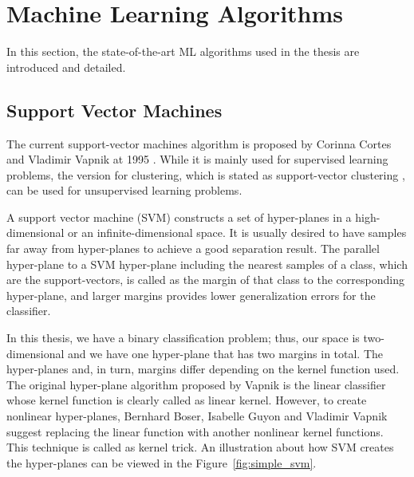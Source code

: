 \section{Machine Learning Algorithms}

In this section, the state-of-the-art ML algorithms used in the thesis are introduced and detailed. 
\subsection{Support Vector Machines}

The current support-vector machines algorithm is proposed by Corinna Cortes and Vladimir Vapnik at 1995 \cite{svm_original}. While it is mainly used for supervised learning problems, the version for clustering, which is stated as support-vector clustering \cite{support_vector_clustering}, can be used for unsupervised learning problems.

A support vector machine (SVM) constructs a set of hyper-planes in a high-dimensional or an infinite-dimensional space. It is usually desired to have samples far away from hyper-planes to achieve a good separation result. The parallel hyper-plane to a SVM hyper-plane including the nearest samples of a class, which are the support-vectors, is called as the margin of that class to the corresponding hyper-plane, and larger margins provides lower generalization errors for the classifier. 

In this thesis, we have a binary classification problem; thus, our space is two-dimensional and we have one hyper-plane that has two margins in total. The hyper-planes and, in turn, margins differ depending on the kernel function used. The original hyper-plane algorithm proposed by Vapnik \cite{svm_original} is the linear classifier whose kernel function is clearly called as linear kernel. However, to create nonlinear hyper-planes, Bernhard Boser, Isabelle Guyon  and Vladimir Vapnik \cite{svm_kernel} suggest replacing the linear function with another nonlinear kernel functions. This technique is called as kernel trick. An illustration about how SVM creates the hyper-planes can be viewed in the Figure~\ref{fig:simple_svm}.

